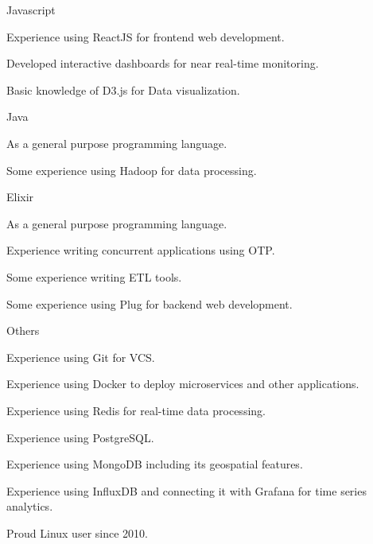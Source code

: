 \begin{cvskills}

\cvskill
{Javascript} %
{
  \begin{cvitems}
  \item {Experience using ReactJS for frontend web development.}
  \item {Developed interactive dashboards for near real-time monitoring. }
  \item {Basic knowledge of D3.js for Data visualization.}
  \end{cvitems}
}


\cvskill
{Java} %
{
  \begin{cvitems}
  \item {As a general purpose programming language.}
  \item {Some experience using Hadoop for data processing.}
  \end{cvitems}
}


\cvskill
{Elixir} %
{
  \begin{cvitems}
  \item {As a general purpose programming language.}
  \item {Experience writing concurrent applications using OTP.}
  \item {Some experience writing ETL tools.}
  \item {Some experience using Plug for backend web development.}
  \end{cvitems}
}


\cvskill
{Others} %
{
  \begin{cvitems}
  \item {Experience using Git for VCS.}
  \item {Experience using Docker to deploy microservices and other applications.}
  \item {Experience using Redis for real-time data processing.}
  \item {Experience using PostgreSQL.}
  \item {Experience using MongoDB including its geospatial features.}
  \item {Experience using InfluxDB and connecting it with Grafana for time series analytics.}
  \item {Proud Linux user since 2010.}
  \end{cvitems}
}


\end{cvskills}

